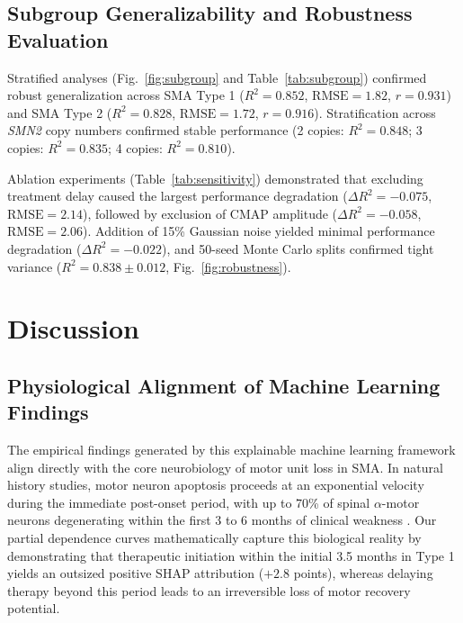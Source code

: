 \documentclass[journal]{IEEEtran}
\begin{document}
\subsection{Subgroup Generalizability and Robustness Evaluation}
Stratified analyses (Fig.~\ref{fig:subgroup} and Table~\ref{tab:subgroup}) confirmed robust generalization across SMA Type 1 ($R^2 = 0.852$, $\text{RMSE} = 1.82$, $r = 0.931$) and SMA Type 2 ($R^2 = 0.828$, $\text{RMSE} = 1.72$, $r = 0.916$). Stratification across \textit{SMN2} copy numbers confirmed stable performance (2 copies: $R^2 = 0.848$; 3 copies: $R^2 = 0.835$; 4 copies: $R^2 = 0.810$).

Ablation experiments (Table~\ref{tab:sensitivity}) demonstrated that excluding treatment delay caused the largest performance degradation ($\Delta R^2 = -0.075$, $\text{RMSE} = 2.14$), followed by exclusion of CMAP amplitude ($\Delta R^2 = -0.058$, $\text{RMSE} = 2.06$). Addition of 15\% Gaussian noise yielded minimal performance degradation ($\Delta R^2 = -0.022$), and 50-seed Monte Carlo splits confirmed tight variance ($R^2 = 0.838 \pm 0.012$, Fig.~\ref{fig:robustness}).

\section{Discussion}

\subsection{Physiological Alignment of Machine Learning Findings}
The empirical findings generated by this explainable machine learning framework align directly with the core neurobiology of motor unit loss in SMA. In natural history studies, motor neuron apoptosis proceeds at an exponential velocity during the immediate post-onset period, with up to 70\% of spinal $\alpha$-motor neurons degenerating within the first 3 to 6 months of clinical weakness \cite{swoboda2005natural}. Our partial dependence curves mathematically capture this biological reality by demonstrating that therapeutic initiation within the initial 3.5 months in Type 1 yields an outsized positive SHAP attribution ($+2.8$ points), whereas delaying therapy beyond this period leads to an irreversible loss of motor recovery potential.
\end{document}
